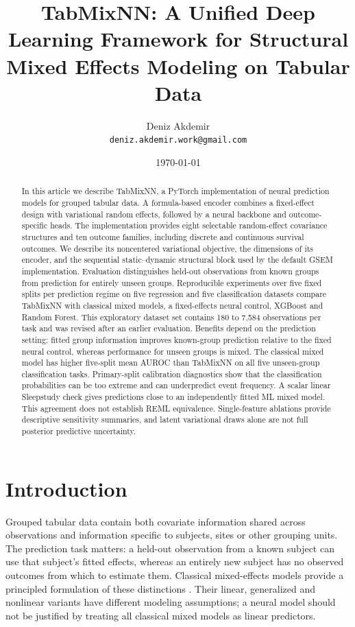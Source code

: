 \documentclass[12pt,a4paper]{article}
\title{TabMixNN: A Unified Deep Learning Framework for Structural Mixed Effects Modeling on Tabular Data}
\author{
    Deniz Akdemir \\
    \texttt{deniz.akdemir.work@gmail.com}
}
\date{\today}
\begin{document}
\maketitle

\begin{abstract}
In this article we describe TabMixNN, a PyTorch implementation of neural prediction models for grouped tabular data. A formula-based encoder combines a fixed-effect design with variational random effects, followed by a neural backbone and outcome-specific heads. The implementation provides eight selectable random-effect covariance structures and ten outcome families, including discrete and continuous survival outcomes. We describe its noncentered variational objective, the dimensions of its encoder, and the sequential static--dynamic structural block used by the default GSEM implementation. Evaluation distinguishes held-out observations from known groups from prediction for entirely unseen groups. Reproducible experiments over five fixed splits per prediction regime on five regression and five classification datasets compare TabMixNN with classical mixed models, a fixed-effects neural control, XGBoost and Random Forest. This exploratory dataset set contains 180 to 7,584 observations per task and was revised after an earlier evaluation. Benefits depend on the prediction setting: fitted group information improves known-group prediction relative to the fixed neural control, whereas performance for unseen groups is mixed. The classical mixed model has higher five-split mean AUROC than TabMixNN on all five unseen-group classification tasks. Primary-split calibration diagnostics show that the classification probabilities can be too extreme and can underpredict event frequency. A scalar linear Sleepstudy check gives predictions close to an independently fitted ML mixed model. This agreement does not establish REML equivalence. Single-feature ablations provide descriptive sensitivity summaries, and latent variational draws alone are not full posterior predictive uncertainty.

\end{abstract}

\section{Introduction}

Grouped tabular data contain both covariate information shared across observations and information specific to subjects, sites or other grouping units. The prediction task matters: a held-out observation from a known subject can use that subject's fitted effects, whereas an entirely new subject has no observed outcomes from which to estimate them. Classical mixed-effects models provide a principled formulation of these distinctions \citep{bates2014fitting, pinheiro2006mixed}. Their linear, generalized and nonlinear variants have different modeling assumptions; a neural model should not be justified by treating all classical mixed models as linear predictors.
\end{document}
